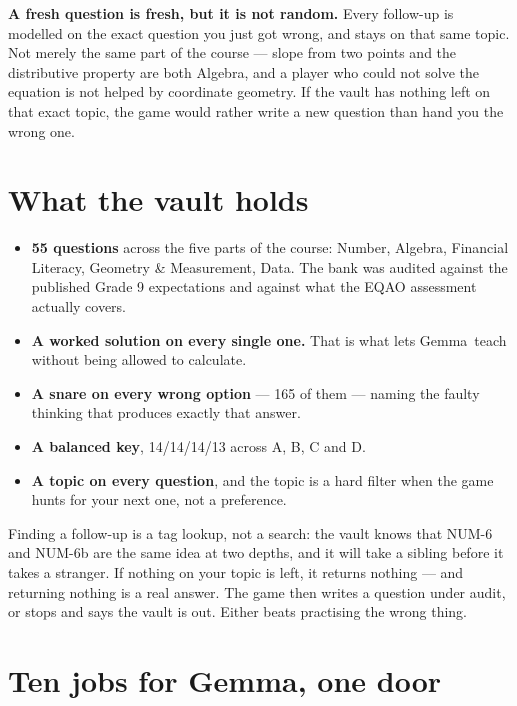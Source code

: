 \documentclass[11pt]{article}
\newcommand{\themodel}{Gemma}
\begin{document}
\begin{quietbox}
\textbf{A fresh question is fresh, but it is not random.} Every follow-up is
modelled on the exact question you just got wrong, and stays on that same
topic. Not merely the same part of the course --- slope from two points and the
distributive property are both Algebra, and a player who could not solve the
equation is not helped by coordinate geometry. If the vault has nothing left on
that exact topic, the game would rather write a new question than hand you the
wrong one.
\end{quietbox}

\section{What the vault holds}

\begin{itemize}
  \item \textbf{55 questions} across the five parts of the course: Number,
        Algebra, Financial Literacy, Geometry \& Measurement, Data. The bank
        was audited against the published Grade 9 expectations and against what the
        EQAO assessment actually covers.
  \item \textbf{A worked solution on every single one.} That is what lets
        \themodel\ teach without being allowed to calculate.
  \item \textbf{A snare on every wrong option} --- 165 of them --- naming the
        faulty thinking that produces exactly that answer.
  \item \textbf{A balanced key}, 14/14/14/13 across A, B, C and D.
  \item \textbf{A topic on every question}, and the topic is a hard filter when
        the game hunts for your next one, not a preference.
\end{itemize}

Finding a follow-up is a tag lookup, not a search: the vault knows that NUM-6
and NUM-6b are the same idea at two depths, and it will take a sibling before
it takes a stranger. If nothing on your topic is left, it returns nothing ---
and returning nothing is a real answer. The game then writes a question under
audit, or stops and says the vault is out. Either beats practising the wrong
thing.

\section{Ten jobs for \themodel, one door}
\end{document}
